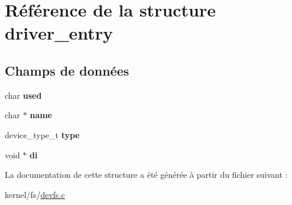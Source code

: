 \hypertarget{structdriver__entry}{\section{\-Référence de la structure driver\-\_\-entry}
\label{structdriver__entry}
}
\subsection*{\-Champs de données}
\begin{DoxyCompactItemize}
\item 
\hypertarget{structdriver__entry_a9a2a74aad52e09fb03bef9703530e28f}{char {\bfseries used}}\label{structdriver__entry_a9a2a74aad52e09fb03bef9703530e28f}

\item 
\hypertarget{structdriver__entry_afc014b612d6cedf602aab7255d4576c1}{char $\ast$ {\bfseries name}}\label{structdriver__entry_afc014b612d6cedf602aab7255d4576c1}

\item 
\hypertarget{structdriver__entry_a3d74a551a1bbb2f2583ba058877b52a4}{device\-\_\-type\-\_\-t {\bfseries type}}\label{structdriver__entry_a3d74a551a1bbb2f2583ba058877b52a4}

\item 
\hypertarget{structdriver__entry_ab5b691637ec5edbbe58442fc57f5aba4}{void $\ast$ {\bfseries di}}\label{structdriver__entry_ab5b691637ec5edbbe58442fc57f5aba4}

\end{DoxyCompactItemize}


\-La documentation de cette structure a été générée à partir du fichier suivant \-:\begin{DoxyCompactItemize}
\item 
kernel/fs/\hyperlink{devfs_8c}{devfs.\-c}\end{DoxyCompactItemize}
